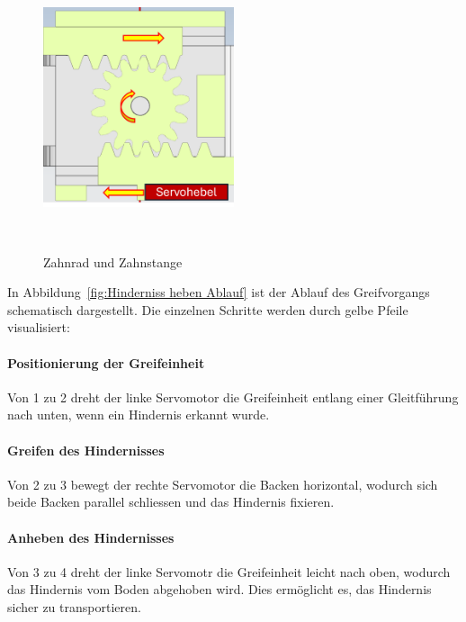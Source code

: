 \documentclass[main.tex]{subfiles} %
\begin{document}
\begin{figure}[H]
    \centering
    \includegraphics[width=0.5\textwidth]{Zahnrad_und_Zahnstange.png}
    \caption{Zahnrad und Zahnstange}~\label{fig:Zahnrad und Zahnstange}
\end{figure}


In Abbildung~\ref{fig:Hinderniss heben Ablauf} ist der Ablauf des Greifvorgangs schematisch dargestellt. Die einzelnen Schritte werden durch gelbe Pfeile visualisiert:

\paragraph{Positionierung der Greifeinheit} 
Von 1 zu 2 dreht der linke Servomotor die Greifeinheit entlang einer Gleitführung nach unten, wenn ein Hindernis erkannt wurde.

\paragraph{Greifen des Hindernisses} 

Von 2 zu 3 bewegt der rechte Servomotor die Backen horizontal, wodurch sich beide Backen parallel schliessen und das Hindernis fixieren.

\paragraph{Anheben des Hindernisses} 

Von 3 zu 4 dreht der linke Servomotr die Greifeinheit leicht nach oben, wodurch das Hindernis vom Boden abgehoben wird. 
Dies ermöglicht es, das Hindernis sicher zu transportieren.
\end{document}
